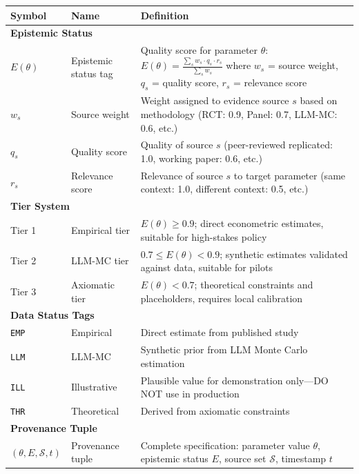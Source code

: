 \begin{center}
\renewcommand{\arraystretch}{1.3}
\begin{longtable}{@{}lp{3cm}p{8cm}@{}}
\toprule
\textbf{Symbol} & \textbf{Name} & \textbf{Definition} \\
\midrule
\endhead

\multicolumn{3}{l}{\textbf{Epistemic Status}} \\
\midrule
$E(\theta)$ & Epistemic status tag & Quality score for parameter $\theta$: $E(\theta) = \frac{\sum_s w_s \cdot q_s \cdot r_s}{\sum_s w_s}$ where $w_s$ = source weight, $q_s$ = quality score, $r_s$ = relevance score \\
$w_s$ & Source weight & Weight assigned to evidence source $s$ based on methodology (RCT: 0.9, Panel: 0.7, LLM-MC: 0.6, etc.) \\
$q_s$ & Quality score & Quality of source $s$ (peer-reviewed replicated: 1.0, working paper: 0.6, etc.) \\
$r_s$ & Relevance score & Relevance of source $s$ to target parameter (same context: 1.0, different context: 0.5, etc.) \\
\midrule

\multicolumn{3}{l}{\textbf{Tier System}} \\
\midrule
Tier 1 & Empirical tier & $E(\theta) \geq 0.9$; direct econometric estimates, suitable for high-stakes policy \\
Tier 2 & LLM-MC tier & $0.7 \leq E(\theta) < 0.9$; synthetic estimates validated against data, suitable for pilots \\
Tier 3 & Axiomatic tier & $E(\theta) < 0.7$; theoretical constraints and placeholders, requires local calibration \\
\midrule

\multicolumn{3}{l}{\textbf{Data Status Tags}} \\
\midrule
\texttt{EMP} & Empirical & Direct estimate from published study \\
\texttt{LLM} & LLM-MC & Synthetic prior from LLM Monte Carlo estimation \\
\texttt{ILL} & Illustrative & Plausible value for demonstration only---DO NOT use in production \\
\texttt{THR} & Theoretical & Derived from axiomatic constraints \\
\midrule

\multicolumn{3}{l}{\textbf{Provenance Tuple}} \\
\midrule
$(\theta, E, \mathcal{S}, t)$ & Provenance tuple & Complete specification: parameter value $\theta$, epistemic status $E$, source set $\mathcal{S}$, timestamp $t$ \\
\bottomrule
\end{longtable}
\end{center}

